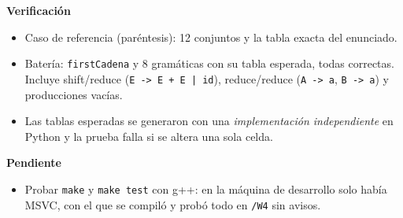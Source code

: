 \documentclass[10pt,a4paper]{article}
\begin{document}
\medskip
\textbf{Verificación}
\begin{itemize}[nosep,leftmargin=*]
\item Caso de referencia (paréntesis): 12 conjuntos y la tabla exacta del enunciado.
\item Batería: \texttt{firstCadena} y 8 gramáticas con su tabla esperada, todas
      correctas. Incluye shift/reduce (\texttt{E -> E + E | id}), reduce/reduce
      (\texttt{A -> a}, \texttt{B -> a}) y producciones vacías.
\item Las tablas esperadas se generaron con una \emph{implementación
      independiente} en Python y la prueba falla si se altera una sola celda.
\end{itemize}

\medskip
\textbf{Pendiente}
\begin{itemize}[nosep,leftmargin=*]
\item Probar \texttt{make} y \texttt{make test} con g++: en la máquina de
      desarrollo solo había MSVC, con el que se compiló y probó todo en
      \texttt{/W4} sin avisos.
\end{itemize}
\end{document}
